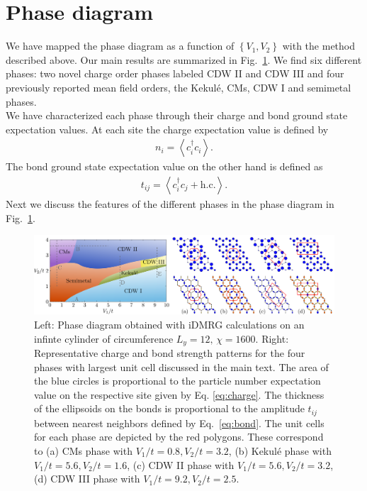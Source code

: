 \documentclass[aps,prx,10pt,twocolumn,floatfix,superscriptaddress,showpacs,numerical,footinbib]{revtex4-1}
\begin{document}
\section{\label{sec:phasediagram}Phase diagram}
%
We have mapped the phase diagram as a function of $\left\lbrace V_{1},V_{2}\right\rbrace$ with the method described above.
%
Our main results are summarized in Fig.~\ref{fig:phase diagram}.
%
We find six different phases: two novel charge order phases labeled CDW II and CDW III and four previously 
reported mean field orders, the Kekul\'{e}, CMs, CDW I and semimetal phases.\\
%
We have characterized each phase through their charge and bond ground state
expectation values.
%
At each site the charge expectation value is defined by 
%
\begin{eqnarray}
\label{eq:charge}
n_{i}=\left\langle c^{\dagger}_{i}c_{i}\right\rangle.
\end{eqnarray}
%
The bond ground state expectation value on the other hand is defined as
%
\begin{eqnarray}
\label{eq:bond}
t_{ij}=\left\langle c^{\dagger}_{i}c_{j}+\mathrm{h.c.}\right\rangle.
\end{eqnarray}
%
Next we discuss the features of the different phases in the phase diagram in Fig.~\ref{fig:phase diagram}.


\begin{figure}
 \includegraphics[width=\textwidth]{pdf/phase_diagram_ext.pdf}
 \caption{Left: Phase diagram obtained with iDMRG calculations on an infinte cylinder of circumference $L_{y}=12, \, \chi = 1600$. 
 Right: Representative charge and bond strength patterns for the four phases with largest unit cell discussed in the main text. 
 The area of the blue circles is proportional to the particle number expectation value on the respective site given by Eq. \eqref{eq:charge}. 
 The thickness of the ellipsoids on the bonds is proportional to the amplitude $t_{ij}$ between nearest neighbors defined by Eq.~\eqref{eq:bond}.
 The unit cells for each phase are depicted by the red polygons. 
 These correspond to (a) CMs phase with $V_1/t = 0.8, V_2/t = 3.2 $, (b) Kekul\'e phase with $V_1/t = 5.6, V_2/t = 1.6 $, (c) CDW II phase with $V_1/t = 5.6, V_2/t = 3.2$,  
 (d) CDW III phase with $V_1/t = 9.2, V_2/t = 2.5$. 
 \label{fig:phase diagram}}
\end{figure}
\end{document}
